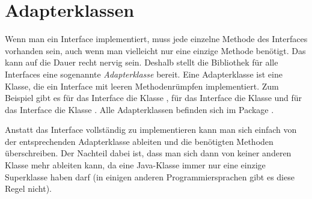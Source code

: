 \section{Adapterklassen}

Wenn man ein Interface implementiert, muss jede einzelne Methode des Interfaces
vorhanden sein, auch wenn man vielleicht nur eine einzige Methode benötigt. Das
kann auf die Dauer recht nervig sein. Deshalb stellt die Bibliothek für alle
Interfaces eine sogenannte \emph{Adapterklasse} bereit. Eine Adapterklasse ist
eine Klasse, die ein Interface mit leeren Methodenrümpfen implementiert. Zum
Beispiel gibt es für das Interface  die Klasse
, für das Interface  die
Klasse  und für das Interface 
die Klasse . Alle Adapterklassen befinden sich im Package
.

Anstatt das Interface vollständig zu implementieren kann man sich einfach von
der entsprechenden Adapterklasse ableiten und die benötigten Methoden
überschreiben. Der Nachteil dabei ist, dass man sich dann von keiner anderen
Klasse mehr ableiten kann, da eine Java-Klasse immer nur eine einzige
Superklasse haben darf (in einigen anderen Programmiersprachen gibt es diese
Regel nicht).
